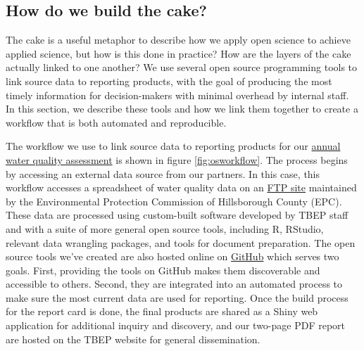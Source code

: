 \documentclass[
]{book}
\begin{document}
\hypertarget{automation}{%
\subsection{How do we build the cake?}\label{automation}}

The cake is a useful metaphor to describe how we apply open science to achieve applied science, but how is this done in practice? How are the layers of the cake actually linked to one another? We use several open source programming tools to link source data to reporting products, with the goal of producing the most timely information for decision-makers with minimal overhead by internal staff. In this section, we describe these tools and how we link them together to create a workflow that is both automated and reproducible.

The workflow we use to link source data to reporting products for our \href{https://tbep.org/water-quality-report-card/}{annual water quality assessment} is shown in figure \ref{fig:osworkflow}. The process begins by accessing an external data source from our partners. In this case, this workflow accesses a spreadsheet of water quality data on an \href{ftp://ftp.epchc.org/EPC_ERM_FTP/WQM_Reports/}{FTP site} maintained by the Environmental Protection Commission of Hillsborough County (EPC). These data are processed using custom-built software developed by TBEP staff and with a suite of more general open source tools, including R, RStudio, relevant data wrangling packages, and tools for document preparation. The open source tools we've created are also hosted online on \href{https://github.com/tbep-tech}{GitHub} which serves two goals. First, providing the tools on GitHub makes them discoverable and accessible to others. Second, they are integrated into an automated process to make sure the most current data are used for reporting. Once the build process for the report card is done, the final products are shared as a Shiny web application for additional inquiry and discovery, and our two-page PDF report are hosted on the TBEP website for general dissemination.
\end{document}
